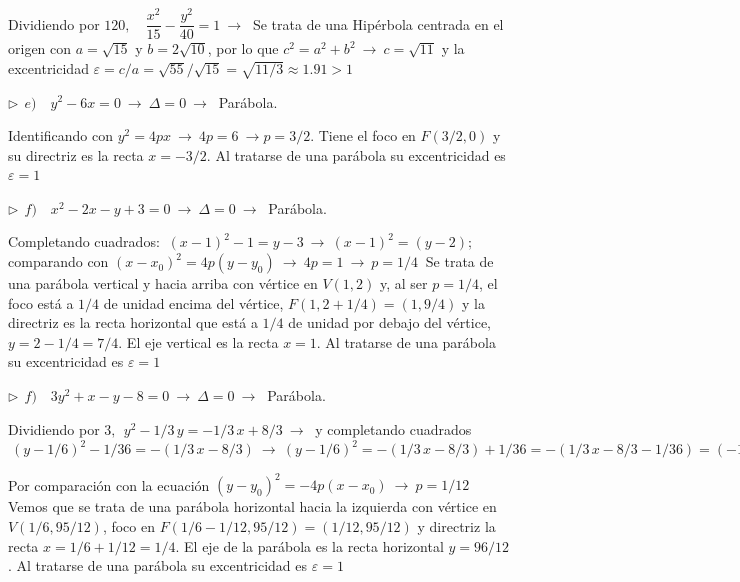 \begin{miejercicio}
\vspace{2mm}  Dividiendo por $120, \quad \dfrac{x^2}{15}- \dfrac{y^2}{40}=1 \ \to \ $ Se trata de una Hipérbola centrada en el origen con $a=\sqrt{15}$ y $b=2\sqrt{10}$, por lo que $c^2=a^2+b^2 \ \to \ c=\sqrt{11}$ y la excentricidad $\varepsilon=c/a=\sqrt{55}/\sqrt{15}=\sqrt{11/3}\approx 1.91>1$ 

\vspace{5mm} $\triangleright\ \ e) \quad y^2-6x=0 \ \to \ \Delta=0 \ \to \  $ Parábola. 

\vspace{2mm}  Identificando con $y^2=4px \ \to \ 4p=6 \ \to p=3/2$. Tiene el foco en $F(3/2,0)$ y su directriz es la recta $x=-3/2$. Al tratarse de una parábola su excentricidad es $\varepsilon=1$

\vspace{5mm} $\triangleright\ \ f) \quad x^2-2x-y+3=0 \ \to \ \Delta=0 \ \to \ $ Parábola. 

\vspace{2mm} Completando cuadrados: $ \ (x-1)^2-1=y-3 \ \to \ (x-1)^2=(y-2);\ $ comparando con $(x-x_0)^2=4p(y-y_0) \ \to \  4p=1 \ \to \ p=1/4\ $  Se trata de una parábola vertical y hacia arriba con vértice en $V(1,2)$ y, al ser $p=1/4$, el foco está a $1/4$ de unidad encima del vértice, $F(1,2+1/4)=(1,9/4)$ y la directriz es la recta horizontal que está a $1/4$ de unidad por debajo del vértice, $y=2-1/4=7/4$. El eje vertical es la recta $x=1$.  Al tratarse de una parábola su excentricidad es $\varepsilon=1$

\vspace{5mm} $\triangleright\ \ f) \quad  3y^2+x-y-8=0 \ \to \ \Delta=0 \ \to \ $ Parábola. 

\vspace{2mm} Dividiendo por $3, \ \ y^2-1/3\, y =-1/3\, x +8/3 \ \to \ $  y completando cuadrados $\ (y-1/6)^2-1/36=-(1/3\, x - 8/3) \ \to \ (y-1/6)^2= - ( 1/3 \, x - 8/3 ) + 1/36 =-(1/3\, x - 8/3-1/36)=(-1/3\, x -95/36)=-1/3(x-95/12)$ 

\vspace{2mm} Por comparación con la ecuación $(y-y_0)^2=-4p(x-x_0) \ \to \ p=1/12 \ $ Vemos que se trata de una parábola horizontal hacia la izquierda con vértice en  $V(1/6,95/12)$, foco en $F(1/6-1/12,95/12)=(1/12,95/12)$ y directriz la recta $x=1/6+1/12=1/4$. El eje de la parábola es la recta horizontal $y=96/12$.  Al tratarse de una parábola su excentricidad es $\varepsilon=1$

\end{miejercicio}


